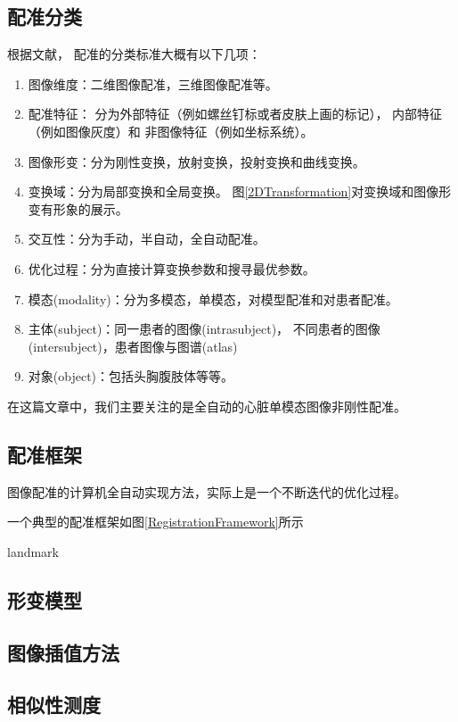 \subsection{配准分类}
根据文献\cite{RegistrationSurvey,RegistrationSurveyNew}，
配准的分类标准大概有以下几项：
\begin{enumerate}
  \item 图像维度：二维图像配准，三维图像配准等。
  \item 配准特征：
    分为外部特征（例如螺丝钉标或者皮肤上画的标记），
    内部特征（例如图像灰度）和
    非图像特征（例如坐标系统）。
  \item 图像形变：分为刚性变换，放射变换，投射变换和曲线变换。
  \item 变换域：分为局部变换和全局变换。
    图\ref{2DTransformation}对变换域和图像形变有形象的展示。
  \item 交互性：分为手动，半自动，全自动配准。
  \item 优化过程：分为直接计算变换参数和搜寻最优参数。
  \item 模态(modality)：分为多模态，单模态，对模型配准和对患者配准。
  \item 主体(subject)：同一患者的图像(intrasubject)，
    不同患者的图像(intersubject)，患者图像与图谱(atlas)
  \item 对象(object)：包括头胸腹肢体等等。
\end{enumerate}

在这篇文章中，我们主要关注的是全自动的心脏单模态图像非刚性配准。

\subsection{配准框架}
图像配准的计算机全自动实现方法，实际上是一个不断迭代的优化过程。

一个典型的配准框架如图\ref{RegistrationFramework}所示

landmark\par
\subsection{形变模型}
\subsection{图像插值方法}
\subsection{相似性测度}
